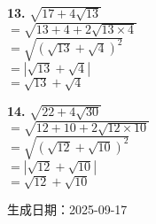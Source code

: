 \documentclass[a4paper,11pt]{article}
\newcommand{\explanationbox}[2][]{%
  \begin{tcolorbox}[explanationstyle, #1]
    #2
  \end{tcolorbox}
}
\begin{document}
\begin{multicols}{2}
\explanationbox{\textbf{13.} $\sqrt{17 + 4\sqrt{13}}$\\[0.3em]$= \sqrt{13+4 + 2\sqrt{13 \times 4}}$\\[0.3em]$= \sqrt{(\sqrt{13} + \sqrt{4})^2}$\\[0.3em]$= |\sqrt{13} + \sqrt{4}|$\\[0.3em]$= \sqrt{13} + \sqrt{4}$}

\explanationbox{\textbf{14.} $\sqrt{22 + 4\sqrt{30}}$\\[0.3em]$= \sqrt{12+10 + 2\sqrt{12 \times 10}}$\\[0.3em]$= \sqrt{(\sqrt{12} + \sqrt{10})^2}$\\[0.3em]$= |\sqrt{12} + \sqrt{10}|$\\[0.3em]$= \sqrt{12} + \sqrt{10}$}

\end{multicols}

\vfill
\begin{center}
\small{生成日期：2025-09-17}
\end{center}
\end{document}
